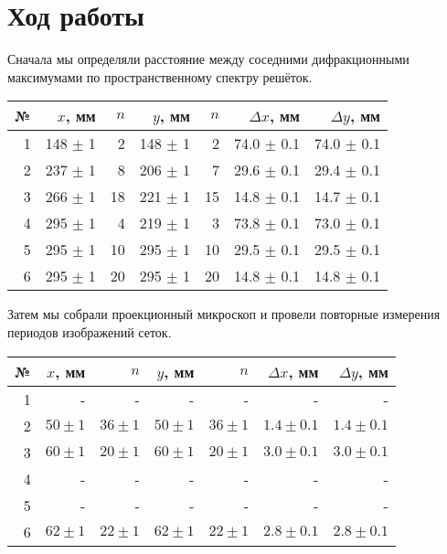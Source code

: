 \section*{Ход работы}
Сначала мы определяли расстояние между соседними дифракционными максимумами по пространственному спектру решёток.
\begin{table}[H]
\centering
\begin{tabular}{|r||r|r||r|r||r|r|}
\hline
№ & $x$, мм & $n$ & $y$, мм & $n$ & $\Delta x$, мм & $\Delta y$, мм        \\ \hline \hline
1  & 148 $\pm$ 1 & 2 & 148 $\pm$ 1 & 2  & 74.0 $\pm$ 0.1 & 74.0 $\pm$ 0.1            \\ \hline
2  & 237 $\pm$ 1 & 8 & 206 $\pm$ 1 & 7 & 29.6 $\pm$ 0.1  & 29.4 $\pm$ 0.1  \\ \hline
3  & 266 $\pm$ 1 & 18 & 221 $\pm$ 1 & 15 & 14.8 $\pm$ 0.1  & 14.7 $\pm$ 0.1   \\ \hline
4  & 295 $\pm$ 1  & 4  & 219 $\pm$ 1  & 3  & 73.8 $\pm$ 0.1     & 73.0 $\pm$ 0.1           \\ \hline
5  & 295 $\pm$ 1  & 10 & 295 $\pm$ 1  & 10 & 29.5 $\pm$ 0.1      & 29.5 $\pm$ 0.1          \\ \hline
6  & 295 $\pm$ 1  & 20 & 295 $\pm$ 1  & 20 & 14.8 $\pm$ 0.1     & 14.8 $\pm$ 0.1         \\ \hline
\end{tabular}
\end{table}
\n
Затем мы собрали проекционный микроскоп и провели повторные измерения периодов изображений сеток.
\begin{table}[H]
\centering
\begin{tabular}{|r||r|r||r|r||r|r|}
\hline
№ & $x$, мм & $n$ & $y$, мм & $n$ & $\Delta x$, мм & $\Delta y$, мм        \\ \hline \hline
1  & -   & -  & -    & -  & -        & -               \\ \hline
2  & $50 \pm 1$  & $36 \pm 1$ & $50 \pm 1$   & $36 \pm 1$ & $1.4 \pm 0.1$ & $1.4 \pm 0.1$  \\ \hline
3  & $60 \pm 1$  & $20 \pm 1$ & $60 \pm 1$  & $20 \pm 1$ & $3.0 \pm 0.1$ & $3.0 \pm 0.1$                \\ \hline
4  & -   & -  & -    & -  & -        & -                \\ \hline
5  & -   & -  & -    & -  & -        & -                \\ \hline
6  & $62 \pm 1$  & $22 \pm 1$ & $62 \pm 1$   & $22 \pm 1$ & $2.8 \pm 0.1$ & $2.8 \pm 0.1$ \\ \hline
\end{tabular}
\end{table}
